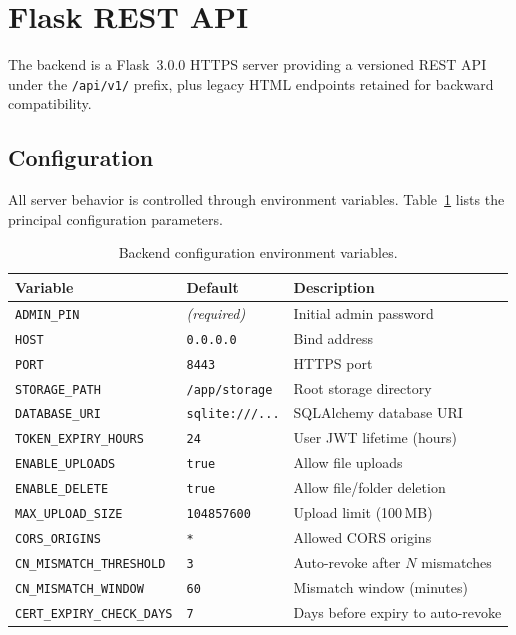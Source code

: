 \documentclass[12pt,letterpaper]{report}
\begin{document}
\section{Flask REST API}

The backend is a Flask~3.0.0 HTTPS server providing a versioned REST API under the \texttt{/api/v1/} prefix, plus legacy HTML endpoints retained for backward compatibility.

\subsection{Configuration}

All server behavior is controlled through environment variables. Table~\ref{tab:backend-config} lists the principal configuration parameters.

\begin{table}[ht]
\centering
\caption{Backend configuration environment variables.}
\label{tab:backend-config}
\small
\begin{tabular}{lll}
\hline
\textbf{Variable} & \textbf{Default} & \textbf{Description} \\
\hline
\texttt{ADMIN\_PIN} & \emph{(required)} & Initial admin password \\
\texttt{HOST} & \texttt{0.0.0.0} & Bind address \\
\texttt{PORT} & \texttt{8443} & HTTPS port \\
\texttt{STORAGE\_PATH} & \texttt{/app/storage} & Root storage directory \\
\texttt{DATABASE\_URI} & \texttt{sqlite:///...} & SQLAlchemy database URI \\
\texttt{TOKEN\_EXPIRY\_HOURS} & \texttt{24} & User JWT lifetime (hours) \\
\texttt{ENABLE\_UPLOADS} & \texttt{true} & Allow file uploads \\
\texttt{ENABLE\_DELETE} & \texttt{true} & Allow file/folder deletion \\
\texttt{MAX\_UPLOAD\_SIZE} & \texttt{104857600} & Upload limit (100\,MB) \\
\texttt{CORS\_ORIGINS} & \texttt{*} & Allowed CORS origins \\
\texttt{CN\_MISMATCH\_THRESHOLD} & \texttt{3} & Auto-revoke after $N$ mismatches \\
\texttt{CN\_MISMATCH\_WINDOW} & \texttt{60} & Mismatch window (minutes) \\
\texttt{CERT\_EXPIRY\_CHECK\_DAYS} & \texttt{7} & Days before expiry to auto-revoke \\
\hline
\end{tabular}
\end{table}
\end{document}

